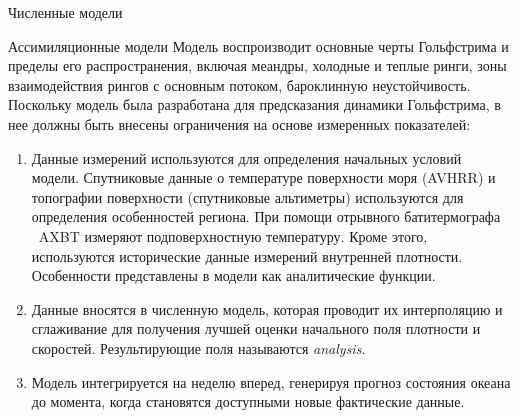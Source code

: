 \begin{chapter}{Численные модели}
\begin{section}{Ассимиляционные модели}
Модель воспроизводит основные черты Гольфстрима 
и пределы его распространения, включая меандры, холодные и теплые ринги, зоны
взаимодействия рингов с основным потоком, бароклинную
неустойчивость. Поскольку модель была разработана для предсказания динамики
Гольфстрима, в нее должны быть внесены ограничения на основе измеренных
показателей:
%
\begin{enumerate}
\item
Данные измерений используются для определения начальных условий
модели. Спутниковые данные о температуре поверхности моря (AVHRR)%
и топографии поверхности (спутниковые альтиметры) используются для определения
особенностей региона. При помощи отрывного батитермографа%
~AXBT измеряют
подповерхностную температуру. Кроме этого, используются исторические данные
измерений внутренней плотности. Особенности представлены в модели как
аналитические функции.
%

\item
Данные вносятся в численную модель, которая проводит их интерполяцию
и сглаживание для получения лучшей оценки начального поля
плотности и скоростей. Результирующие поля называются \emph{analysis}.
%

\item
Модель интегрируется на неделю вперед, генерируя прогноз состояния
океана до момента, когда становятся доступными новые фактические данные.
%


\end{enumerate}
\end{section}
\end{chapter}
